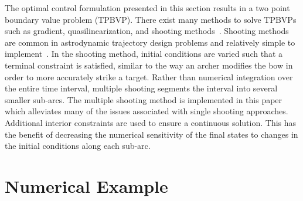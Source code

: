\documentclass[preprint]{elsarticle}
\begin{document}
The optimal control formulation presented in this section results in a two point boundary value problem (TPBVP). 
There exist many methods to solve TPBVPs such as gradient, quasilinearization, and shooting methods~\cite{bryson1975}.
Shooting methods are common in astrodynamic trajectory design problems and relatively simple to implement~\cite{bryson1975}.
In the shooting method, initial conditions are varied such that a terminal constraint is satisfied, similar to the way an archer modifies the bow in order to more accurately strike a target. 
Rather than numerical integration over the entire time interval, multiple shooting segments the interval into several smaller sub-arcs.
The multiple shooting method is implemented in this paper which alleviates many of the issues associated with single shooting approaches.
Additional interior constraints are used to ensure a continuous solution.
This has the benefit of decreasing the numerical sensitivity of the final states to changes in the initial conditions along each sub-arc.
\section{Numerical Example}\label{sec:simulation}
\end{document}
